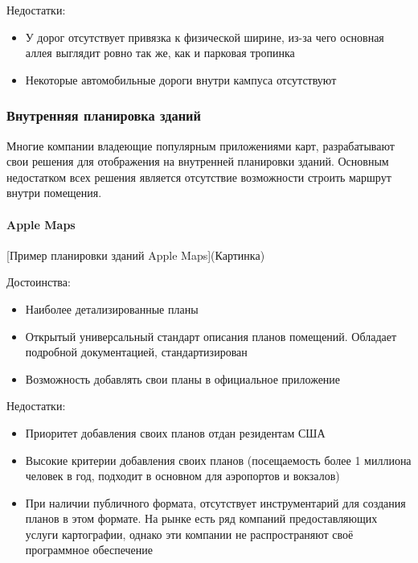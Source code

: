         \noindent Недостатки:
        \begin{itemize}
          \item У дорог отсутствует привязка к физической ширине, из-за чего основная аллея выглядит ровно так же, как и парковая тропинка
          \item Некоторые автомобильные дороги внутри кампуса отсутствуют
        \end{itemize}


    \subsubsection{Внутренняя планировка зданий}
      Многие компании владеющие популярным приложениями карт, разрабатывают свои решения для отображения на внутренней планировки зданий. Основным недостатком всех решения является отсутствие возможности строить маршрут внутри помещения.


      \paragraph{Apple Maps}
        [Пример планировки зданий Apple Maps](Картинка)

        \noindent Достоинства:
        \begin{itemize}
          \item Наиболее детализированные планы
          \item Открытый универсальный стандарт описания планов помещений. Обладает подробной документацией, стандартизирован \cite{https://www.ogc.org/standards/requests/202}
          \item Возможность добавлять свои планы в официальное приложение
        \end{itemize}

        \noindent Недостатки:
        \begin{itemize}
          \item Приоритет добавления своих планов отдан резидентам США
          \item Высокие критерии добавления своих планов (посещаемость более 1 миллиона человек в год, подходит в основном для аэропортов и вокзалов)
          \item При наличии публичного формата, отсутствует инструментарий для создания планов в этом формате. На рынке есть ряд компаний предоставляющих услуги картографии, однако эти компании не распространяют своё программное обеспечение
        \end{itemize}


